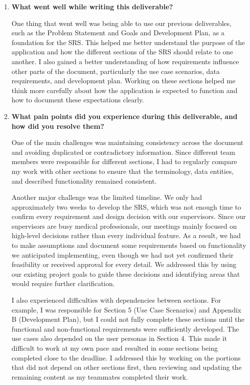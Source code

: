\documentclass[10pt]{article}
\begin{document}
\begin{enumerate}

    \item \textbf{What went well while writing this deliverable?}

    One thing that went well was being able to use our previous
    deliverables, such as the Problem Statement and Goals and
    Development Plan, as a foundation for the SRS. This helped
    me better understand the purpose of the application and
    how the different sections of the SRS should relate to
    one another. I also gained a better understanding of how
    requirements influence other parts of the document,
    particularly the use case scenarios, data requirements,
    and development plan. Working on these sections helped
    me think more carefully about how the application is
    expected to function and how to document these
    expectations clearly.

    \item \textbf{What pain points did you experience during this
    deliverable, and how did you resolve them?}

    One of the main challenges was maintaining consistency
    across the document and avoiding duplicated or
    contradictory information. Since different team members
    were responsible for different sections, I had to
    regularly compare my work with other sections to ensure
    that the terminology, data entities, and described
    functionality remained consistent.

    Another major challenge was the limited timeline.
    We only had approximately two weeks to develop the SRS,
    which was not enough time to confirm every requirement
    and design decision with our supervisors. Since our
    supervisors are busy medical professionals, our meetings
    mainly focused on high-level decisions rather than every
    individual feature. As a result, we had to make
    assumptions and document some requirements based on
    functionality we anticipated implementing, even though
    we had not yet confirmed their feasibility or received
    approval for every detail. We addressed this by using
    our existing project goals to guide these decisions
    and identifying areas that would require further
    clarification.

    I also experienced difficulties with dependencies
    between sections. For example, I was responsible for
    Section 5 (Use Case Scenarios) and Appendix B
    (Development Plan), but I could not fully complete
    these sections until the functional and non-functional
    requirements were sufficiently developed. The use
    cases also depended on the user personas in Section 4.
    This made it difficult to work at my own pace and
    resulted in some sections being completed close to
    the deadline. I addressed this by working on the
    portions that did not depend on other sections first,
    then reviewing and updating the remaining content
    as my teammates completed their work.


\end{enumerate}
\end{document}
